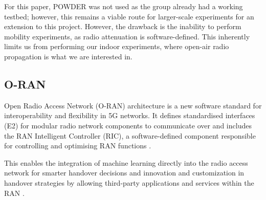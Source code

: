 For this paper, POWDER was not used as the group already had a working testbed; however, this remains a viable route for larger-scale experiments for an extension to this project. However, the drawback is the inability to perform mobility experiments, as radio attenuation is software-defined. This inherently limits us from performing our indoor experiments, where open-air radio propagation is what we are interested in.

\subsection{O-RAN}
Open Radio Access Network (O-RAN) architecture is a new software standard for interoperability and flexibility in 5G networks. It defines standardised interfaces (E2) for modular radio network components to communicate over and includes the RAN Intelligent Controller (RIC), a software-defined component responsible for controlling and optimising RAN functions \citep{juniper_networks_uki_what_2022}. 

This enables the integration of machine learning directly into the radio access network for smarter handover decisions and innovation and customization in handover strategies by allowing third-party applications and services within the RAN  \cite{niknam_intelligent_2020}. 


